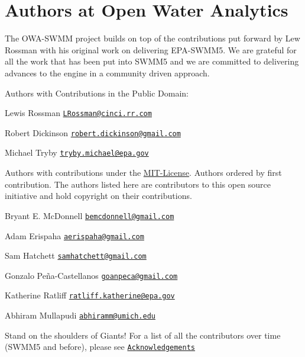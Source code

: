 \hypertarget{group___a_u_t_h_o_r_s}{}\section{Authors at Open Water Analytics}
\label{group___a_u_t_h_o_r_s}
The O\+W\+A-\/\+S\+W\+MM project builds on top of the contributions put forward by Lew Rossman with his original work on delivering E\+P\+A-\/\+S\+W\+M\+M5. We are grateful for all the work that has been put into S\+W\+M\+M5 and we are committed to delivering advances to the engine in a community driven approach.

Authors with Contributions in the Public Domain\+:


\begin{DoxyItemize}
\item Lewis Rossman \href{mailto:LRossman@cinci.rr.com}{\tt L\+Rossman@cinci.\+rr.\+com}
\item Robert Dickinson \href{mailto:robert.dickinson@gmail.com}{\tt robert.\+dickinson@gmail.\+com}
\item Michael Tryby \href{mailto:tryby.michael@epa.gov}{\tt tryby.\+michael@epa.\+gov}
\end{DoxyItemize}

Authors with contributions under the \hyperlink{group___m_i_t-_license}{M\+I\+T-\/\+License}. Authors ordered by first contribution. The authors listed here are contributors to this open source initiative and hold copyright on their contributions.


\begin{DoxyItemize}
\item Bryant E. Mc\+Donnell \href{mailto:bemcdonnell@gmail.com}{\tt bemcdonnell@gmail.\+com}
\item Adam Erispaha \href{mailto:aerispaha@gmail.com}{\tt aerispaha@gmail.\+com}
\item Sam Hatchett \href{mailto:samhatchett@gmail.com}{\tt samhatchett@gmail.\+com}
\item Gonzalo Peña-\/\+Castellanos \href{mailto:goanpeca@gmail.com}{\tt goanpeca@gmail.\+com}
\item Katherine Ratliff \href{mailto:ratliff.katherine@epa.gov}{\tt ratliff.\+katherine@epa.\+gov}
\item Abhiram Mullapudi \href{mailto:abhiramm@umich.edu}{\tt abhiramm@umich.\+edu}
\end{DoxyItemize}

Stand on the shoulders of Giants! For a list of all the contributors over time (S\+W\+M\+M5 and before), please see \href{https://github.com/OpenWaterAnalytics/Stormwater-Management-Model/wiki/Acknowledgements}{\tt Acknowledgements} 